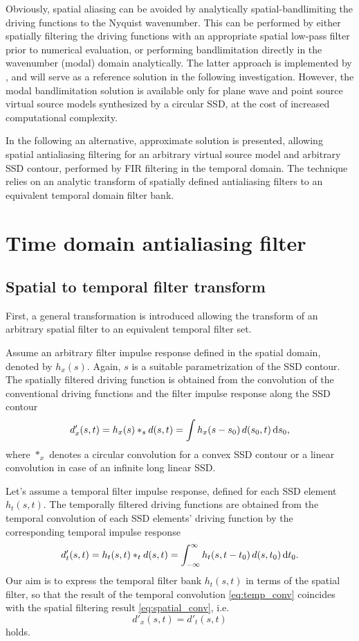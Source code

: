 \documentclass[conference]{IEEEtran}
\begin{document}
Obviously, spatial aliasing can be avoided by analytically spatial-bandlimiting the driving functions to the Nyquist wavenumber.
This can be performed by either spatially filtering the driving functions with an appropriate spatial low-pass filter prior to numerical evaluation, or performing bandlimitation directly in the wavenumber (modal) domain analytically.
The latter approach is implemented by \cite{Nara and Fiete}, and will serve as a reference solution in the following investigation.
However, the modal bandlimitation solution is available only for plane wave and point source virtual source models synthesized by a circular SSD, at the cost of increased computational complexity.

In the following an alternative, approximate solution is presented, allowing spatial antialiasing filtering for an arbitrary virtual source model and arbitrary SSD contour, performed by FIR filtering in the temporal domain.
The technique relies on an analytic transform of spatially defined antialiasing filters to an equivalent temporal domain filter bank.

\section{Time domain antialiasing filter}

\subsection{Spatial to temporal filter transform}
First, a general transformation is introduced allowing the transform of an arbitrary spatial filter to an equivalent temporal filter set.

Assume an arbitrary filter impulse response defined in the spatial domain, denoted by $h_x(s)$.
Again, $s$ is a suitable parametrization of the SSD contour.
The spatially filtered driving function is obtained from the convolution of the conventional driving functions and the filter impulse response along the SSD contour
\begin{equation}
    d'_x(s,t) = h_x(s) \ast_s d(s,t) = \int h_x(s-s_0) \, d(s_0,t) \, \td s_0,
    \label{eq:spatial_conv}
\end{equation}
where $\ast_x$ denotes a circular convolution for a convex SSD contour or a linear convolution in case of an infinite long linear SSD.

Let's assume a temporal filter impulse response, defined for each SSD element $h_t(s,t)$.
The temporally filtered driving functions are obtained from the temporal convolution of each SSD elements' driving function by the corresponding temporal impulse response
\begin{equation}
    d'_t(s,t) = h_t(s,t) \ast_t d(s,t) = \int_{-\infty}^{\infty} h_t(s,t-t_0) \, d(s,t_0) \, \td t_0.
    \label{eq:temp_conv}
\end{equation}
Our aim is to express the temporal filter bank $h_t(s,t)$ in terms of the spatial filter, so that the result of the temporal convolution \eqref{eq:temp_conv} coincides with the spatial filtering result \eqref{eq:spatial_conv}, i.e.
\begin{equation}
    d'_x(s,t) = d'_t(s,t)
\end{equation}
holds.
\end{document}
